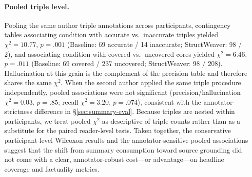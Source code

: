 \documentclass[manuscript,review,anonymous]{acmart}
\begin{document}
\paragraph{Pooled triple level.}
Pooling the same author triple annotations across participants, contingency tables associating condition with accurate vs.\ inaccurate triples yielded $\chi^2=10.77$, $p=.001$ (Baseline: 69 accurate / 14 inaccurate; StructWeaver: 98 / 2), and associating condition with covered vs.\ uncovered cores yielded $\chi^2=6.46$, $p=.011$ (Baseline: 69 covered / 237 uncovered; StructWeaver: 98 / 208). Hallucination at this grain is the complement of the precision table and therefore shares the same $\chi^2$. When the second author applied the same triple procedure independently, pooled associations were not significant (precision/hallucination $\chi^2=0.03$, $p=.85$; recall $\chi^2=3.20$, $p=.074$), consistent with the annotator-strictness difference in \S\ref{sec:summary-eval}. Because triples are nested within participants, we treat pooled $\chi^2$ as descriptive of triple counts rather than as a substitute for the paired reader-level tests. Taken together, the conservative participant-level Wilcoxon results and the annotator-sensitive pooled associations suggest that the shift from summary consumption toward source grounding did not come with a clear, annotator-robust cost---or advantage---on headline coverage and factuality metrics.
\end{document}
